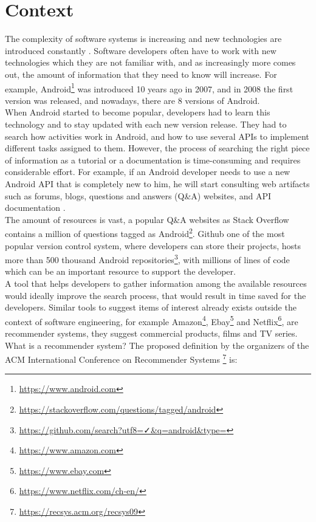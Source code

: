\documentclass[12pt,mscthesis]{usiinfthesis}
\begin{document}
	\section{Context}
	The complexity of software systems is increasing and new technologies are introduced constantly \cite{Lehman:1985:PEP:7261}. Software developers often have to work with new technologies which they are not familiar with, and as increasingly more comes out, the amount of information that they need to know will increase. For example, Android\footnote{\url{https://www.android.com}} was introduced 10 years ago in 2007, and in 2008 the first version was released, and nowadays, there are 8 versions of Android. \\
	When Android started to become popular, developers had to learn this technology and to stay updated with each new version release.
	They had to search how activities work in Android, and how to use several APIs to implement different tasks assigned to them.
	However, the process of searching the right piece of information as a tutorial or a documentation is time-consuming and requires considerable effort.
	For example, if an Android developer needs to use a new Android API that is completely new to him, he will start consulting web artifacts such as forums, blogs, questions and answers (Q\&A) websites, and API documentation \cite{Sim:2011:WSE:2063239.2063243}.\\
	The amount of resources is vast, a popular Q\&A websites as Stack Overflow contains a million of questions tagged as Android\footnote{\url{https://stackoverflow.com/questions/tagged/android}}. Github one of the most popular version control system, where developers can store their projects, hosts more than 500 thousand Android repositories\footnote{\url{https://github.com/search?utf8=✓&q=android&type=}}, with millions of lines of code which can be an important resource to support the developer.\\
	A tool that helps developers to gather information among the available resources would ideally improve the search process, that would result in time saved for the developers.
	Similar tools to suggest items of interest already exists outside the context of software engineering, for example Amazon\footnote{\url{https://www.amazon.com}}, Ebay\footnote{\url{https://www.ebay.com}} and Netflix\footnote{\url{https://www.netflix.com/ch-en/}}, are recommender systems, they suggest commercial products, films and TV series.\\
	What is a recommender system? The proposed definition by the organizers of the ACM International Conference on Recommender Systems \footnote{\url{https://recsys.acm.org/recsys09}} is: \\
\end{document}
